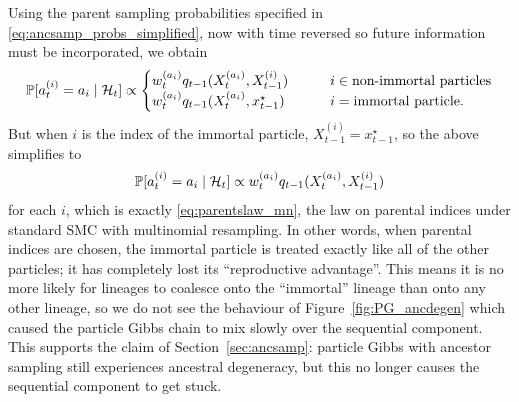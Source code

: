 Using the parent sampling probabilities specified in \eqref{eq:ancsamp_probs_simplified},
now with time reversed so future information must be incorporated,
we obtain
\begin{equation*}
\mathbb{P}[a_t^{(i)} = a_i \mid \mathcal{H}_t ] \propto
\begin{cases}
w_t^{(a_i)} q_{t-1}(X_t^{(a_i)}, X_{t-1}^{(i)}) &\qquad i\in\text{non-immortal particles}\\
w_t^{(a_i)} q_{t-1}(X_t^{(a_i)}, x_{t-1}^\star) &\qquad i=\text{immortal particle} .
\end{cases} 
\end{equation*}
But when $i$ is the index of the immortal particle, $X_{t-1}^{(i)} = x_{t-1}^\star$, so the above simplifies to
\begin{equation*}
\mathbb{P}[a_t^{(i)} = a_i \mid \mathcal{H}_t ] \propto
w_t^{(a_i)} q_{t-1}(X_t^{(a_i)}, X_{t-1}^{(i)})
\end{equation*}
for each $i$, which is exactly \eqref{eq:parentslaw_mn}, the law on parental indices under standard SMC with multinomial resampling.
In other words, when parental indices are chosen, the immortal particle is treated exactly like all of the other particles; it has completely lost its ``reproductive advantage''.
This means it is no more likely for lineages to coalesce onto the ``immortal'' lineage than onto any other lineage, so we do not see the behaviour of Figure~\ref{fig:PG_ancdegen} which caused the particle Gibbs chain to mix slowly over the sequential component.
This supports the claim of Section~\ref{sec:ancsamp}: particle Gibbs with ancestor sampling still experiences ancestral degeneracy, but this no longer causes the sequential component to get stuck.


